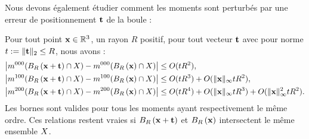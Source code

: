 Nous devons également étudier comment les moments sont perturbés par une erreur de positionnement $\mathbf{t}$ de la boule :
%
\begin{lemma} \label{lem:moments-ball-position-error}
%
  Pour tout point $\mathbf{x} \in \mathbb{R}^3$, un rayon $R$
  positif, pour tout vecteur $\mathbf{t}$ avec pour norme $t := \| \mathbf{t} \|_2 \le R$,
  nous avons :
%
  \begin{align}
    \left| m^{000}(B_{R}\left(\mathbf{x} + \mathbf{t}\right) \cap X) - m^{000}(B_{R}\left(\mathbf{x}\right) \cap X) \right|
    & \le O(t R^2), \label{eq:zero-moments-ball-position-error} \\
    \left| m^{100}(B_{R}\left(\mathbf{x} + \mathbf{t}\right) \cap X) - m^{100}(B_{R}\left(\mathbf{x}\right) \cap X) \right|
    & \le O(t R^3) + O( \|\mathbf{x}\|_\infty t R^2 ), \label{eq:first-moments-ball-position-error}\\
    \left| m^{200}(B_{R}\left(\mathbf{x} + \mathbf{t}\right) \cap X) - m^{200}(B_{R}\left(\mathbf{x}\right) \cap X) \right|
    & \le O(t R^4) + O( \|\mathbf{x}\|_\infty t R^3 ) + O( \|\mathbf{x}\|^2_\infty t R^2 ). \label{eq:second-moments-ball-position-error}
  \end{align}
%
  Les bornes sont valides pour tous les moments ayant respectivement le même
  ordre. Ces relations restent vraies si $B_{R}\left(\mathbf{x}+\mathbf{t}\right)$ et
  $B_{R}\left(\mathbf{x}\right)$ intersectent le même ensemble $X$.
%
\end{lemma}
